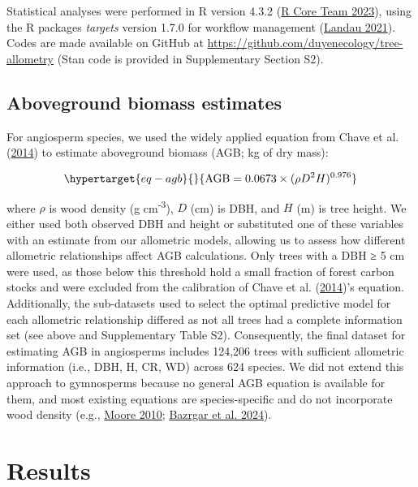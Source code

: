 \documentclass[
  12pt,
  letterpaper,
  DIV=11,
  numbers=noendperiod]{scrartcl}
\begin{document}
Statistical analyses were performed in R version 4.3.2
(\protect\hyperlink{ref-RCoreTeam2023}{R Core Team 2023}), using the R
packages \emph{targets} version 1.7.0 for workflow management
(\protect\hyperlink{ref-Landau2021}{Landau 2021}). Codes are made
available on GitHub at
\url{https://github.com/duyenecology/tree-allometry} (Stan code is
provided in Supplementary Section S2).

\hypertarget{aboveground-biomass-estimates}{%
\subsection{Aboveground biomass
estimates}\label{aboveground-biomass-estimates}}

For angiosperm species, we used the widely applied equation from Chave
et al. (\protect\hyperlink{ref-Chave2014}{2014}) to estimate aboveground
biomass (AGB; kg of dry mass):

\begin{equation}\protect\hypertarget{eq-agb}{}{
\mathrm{AGB} = 0.0673 \times (\rho D^2H)^{0.976}
}\label{eq-agb}\end{equation}

where \(\rho\) is wood density (g cm\textsuperscript{-3}), \(D\) (cm) is
DBH, and \(H\) (m) is tree height. We either used both observed DBH and
height or substituted one of these variables with an estimate from our
allometric models, allowing us to assess how different allometric
relationships affect AGB calculations. Only trees with a DBH ≥ 5 cm were
used, as those below this threshold hold a small fraction of forest
carbon stocks and were excluded from the calibration of Chave et al.
(\protect\hyperlink{ref-Chave2014}{2014})'s equation. Additionally, the
sub-datasets used to select the optimal predictive model for each
allometric relationship differed as not all trees had a complete
information set (see above and Supplementary Table S2). Consequently,
the final dataset for estimating AGB in angiosperms includes 124,206
trees with sufficient allometric information (i.e., DBH, H, CR, WD)
across 624 species. We did not extend this approach to gymnosperms
because no general AGB equation is available for them, and most existing
equations are species-specific and do not incorporate wood density
(e.g., \protect\hyperlink{ref-Moore2010}{Moore 2010};
\protect\hyperlink{ref-Bazrgar2024}{Bazrgar et al. 2024}).

\hypertarget{results}{%
\section{Results}\label{results}}
\end{document}
